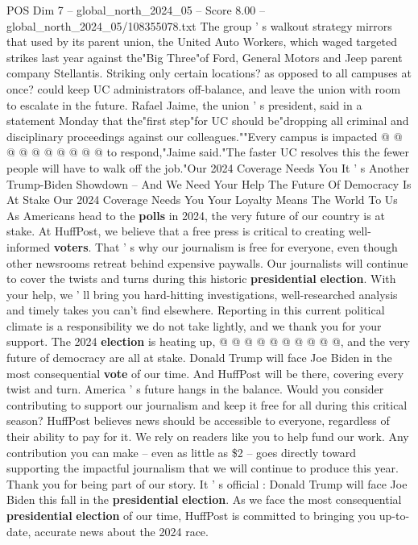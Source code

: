 \begin{textsample}{POS Dim 7 – global\_north\_2024\_05 – Score 8.00 – global\_north\_2024\_05/108355078.txt}
The group ' s walkout strategy mirrors that used by its parent union, the United Auto Workers, which waged targeted strikes last year against the"Big Three"of Ford, General Motors and Jeep parent company Stellantis.
Striking only certain locations? as opposed to all campuses at once? could keep UC administrators off-balance, and leave the union with room to escalate in the future.
Rafael Jaime, the union ' s president, said in a statement Monday that the"first step"for UC should be"dropping all criminal and disciplinary proceedings against our colleagues.""Every campus is impacted @ @ @ @ @ @ @ @ @ @ to respond,"Jaime said."The faster UC resolves this the fewer people will have to walk off the job."Our 2024 Coverage Needs You It ' s Another Trump-Biden Showdown -- And We Need Your Help The Future Of Democracy Is At Stake Our 2024 Coverage Needs You Your Loyalty Means The World To Us As Americans head to the \textbf{polls} in 2024, the very future of our country is at stake.
At HuffPost, we believe that a free press is critical to creating well-informed \textbf{voters}.
That ' s why our journalism is free for everyone, even though other newsrooms retreat behind expensive paywalls.
Our journalists will continue to cover the twists and turns during this historic \textbf{presidential} \textbf{election}.
With your help, we ' ll bring you hard-hitting investigations, well-researched analysis and timely takes you can't find elsewhere.
Reporting in this current political climate is a responsibility we do not take lightly, and we thank you for your support.
The 2024 \textbf{election} is heating up, @ @ @ @ @ @ @ @ @ @, and the very future of democracy are all at stake.
Donald Trump will face Joe Biden in the most consequential \textbf{vote} of our time.
And HuffPost will be there, covering every twist and turn.
America ' s future hangs in the balance.
Would you consider contributing to support our journalism and keep it free for all during this critical season?
HuffPost believes news should be accessible to everyone, regardless of their ability to pay for it.
We rely on readers like you to help fund our work.
Any contribution you can make -- even as little as \$2 -- goes directly toward supporting the impactful journalism that we will continue to produce this year.
Thank you for being part of our story.
It ' s official : Donald Trump will face Joe Biden this fall in the \textbf{presidential} \textbf{election}.
As we face the most consequential \textbf{presidential} \textbf{election} of our time, HuffPost is committed to bringing you up-to-date, accurate news about the 2024 race.

\end{textsample}
